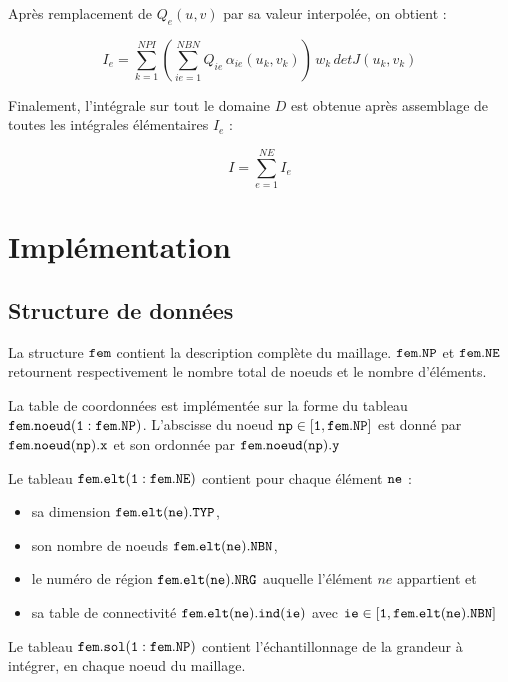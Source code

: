 \documentclass[a4paper, 10pt]{article}
\begin{document}
Après remplacement de $Q_e(u,v)$ par sa valeur interpolée, on obtient :

\begin{equation}
I_e= \sum_{k=1}^{NPI} \left( \sum_{ie=1}^{NBN} Q_{ie}\, \alpha_{ie}(u_k, v_k) \right)\, w_k \, detJ(u_k, v_k)
\label{Ie_expr}
\end{equation}

Finalement, l'intégrale sur tout le domaine $D$ est obtenue après assemblage de toutes
les intégrales élémentaires $I_e$ :

\begin{equation}
I = \sum_{e=1}^{NE} I_e
\end{equation}

\section{Implémentation}
\subsection {Structure de données}

La structure $ \tt{fem }\rm$ contient la description complète du maillage. $ \tt{fem.NP }\rm$  et   $ \tt{fem.NE }\rm$ retournent respectivement le nombre total de noeuds et le nombre d'éléments. 

La table de coordonnées est implémentée sur la forme du tableau $ \tt{fem.noeud(1:fem.NP)} \rm$.
L'abscisse du noeud $\tt{np \in [1,   fem.NP \rm]}$ est donné par $ \tt{fem.noeud(np).x} \rm$ et son
ordonnée par $ \tt{fem.noeud(np).y} \rm$

Le tableau $\tt{fem.elt(1:fem.NE)} \rm$ contient pour chaque élément $ \tt{ne}\rm$ :

\begin{itemize}
\renewcommand\labelitemi{\textbullet}
\item sa dimension $\tt{fem.elt(ne).TYP} \rm$,
\item  son nombre de noeuds $\tt{fem.elt(ne).NBN} \rm$,
\item le numéro de région $\tt{fem.elt(ne).NRG} \rm$ auquelle l'élément $ne$ appartient  et
\item  sa table de connectivité $\tt{fem.elt(ne).ind(ie)} \rm$ avec $\tt{ie \in [1,   fem.elt(ne).NBN \rm]}$
\end{itemize} 

Le tableau $\tt{fem.sol(1:fem.NP)} \rm$ contient l'échantillonnage de la grandeur à intégrer, en chaque noeud
du maillage.
\end{document}
